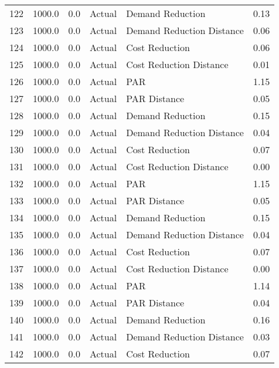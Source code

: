 \begin{longtable}{lrrllr}
122  &       1000.0 &     0.0 &         Actual &           Demand Reduction &   0.13 \\
123  &       1000.0 &     0.0 &         Actual &  Demand Reduction Distance &   0.06 \\
124  &       1000.0 &     0.0 &         Actual &             Cost Reduction &   0.06 \\
125  &       1000.0 &     0.0 &         Actual &    Cost Reduction Distance &   0.01 \\
126  &       1000.0 &     0.0 &         Actual &                        PAR &   1.15 \\
127  &       1000.0 &     0.0 &         Actual &               PAR Distance &   0.05 \\
128  &       1000.0 &     0.0 &         Actual &           Demand Reduction &   0.15 \\
129  &       1000.0 &     0.0 &         Actual &  Demand Reduction Distance &   0.04 \\
130  &       1000.0 &     0.0 &         Actual &             Cost Reduction &   0.07 \\
131  &       1000.0 &     0.0 &         Actual &    Cost Reduction Distance &   0.00 \\
132  &       1000.0 &     0.0 &         Actual &                        PAR &   1.15 \\
133  &       1000.0 &     0.0 &         Actual &               PAR Distance &   0.05 \\
134  &       1000.0 &     0.0 &         Actual &           Demand Reduction &   0.15 \\
135  &       1000.0 &     0.0 &         Actual &  Demand Reduction Distance &   0.04 \\
136  &       1000.0 &     0.0 &         Actual &             Cost Reduction &   0.07 \\
137  &       1000.0 &     0.0 &         Actual &    Cost Reduction Distance &   0.00 \\
138  &       1000.0 &     0.0 &         Actual &                        PAR &   1.14 \\
139  &       1000.0 &     0.0 &         Actual &               PAR Distance &   0.04 \\
140  &       1000.0 &     0.0 &         Actual &           Demand Reduction &   0.16 \\
141  &       1000.0 &     0.0 &         Actual &  Demand Reduction Distance &   0.03 \\
142  &       1000.0 &     0.0 &         Actual &             Cost Reduction &   0.07 \\

\end{longtable}
